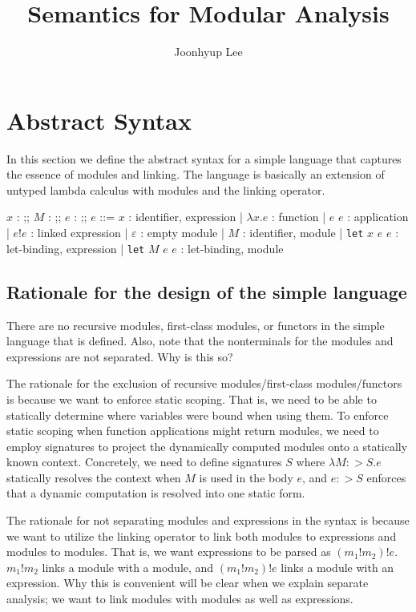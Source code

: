 \documentclass{article}
\title{Semantics for Modular Analysis}
\author{Joonhyup Lee}
\date{}
\theoremstyle{definition}
\newcommand*{\Expr}{\text{Expr}}
\newcommand*{\ExprVar}{\text{ExprVar}}
\newcommand*{\ModVar}{\text{ModVar}}
\newcommand*{\link}[2]{{#1}\mathtt{!}{#2}}
\begin{document}
\maketitle

\section{Abstract Syntax}

In this section we define the abstract syntax for a simple language that captures the essence of modules and linking.
The language is basically an extension of untyped lambda calculus with modules and the linking operator.

\begin{bnfgrammar}
  $x$ : \in \ExprVar
  ;;
  $M$ : \in \ModVar
  ;;
  $e$ : \in \Expr
  ;;
  $e$ ::= $x$ : identifier, expression
  | $\lambda x.e$ : function
  | $e$ $e$ : application
  | $\link{e}{e}$ : linked expression
  | $\varepsilon$ : empty module
  | $M$ : identifier, module
  | \texttt{let} $x$ $e$ $e$ : let-binding, expression
  | \texttt{let} $M$ $e$ $e$ : let-binding, module
\end{bnfgrammar}

\subsection{Rationale for the design of the simple language}

There are no recursive modules, first-class modules, or functors in the simple language that is defined.
Also, note that the nonterminals for the modules and expressions are not separated. Why is this so?

The rationale for the exclusion of recursive modules/first-class modules/functors is because we want to enforce static scoping.
That is, we need to be able to statically determine where variables were bound when using them.
To enforce static scoping when function applications might return modules, we need to employ signatures to project the dynamically computed modules onto a statically known context.
Concretely, we need to define signatures $S$ where $\lambda M:>S.e$ statically resolves the context when $M$ is used in the body $e$, and $e:>S$ enforces that a dynamic computation is resolved into one static form.

The rationale for not separating modules and expressions in the syntax is because we want to utilize the linking operator to link both modules to expressions and modules to modules.
That is, we want expressions to be parsed as $(m_1!m_2)!e$.
$\link{m_1}{m_2}$ links a module with a module, and $(m_1!m_2)!e$ links a module with an expression.
Why this is convenient will be clear when we explain separate analysis; we want to link modules with modules as well as expressions.
\end{document}
